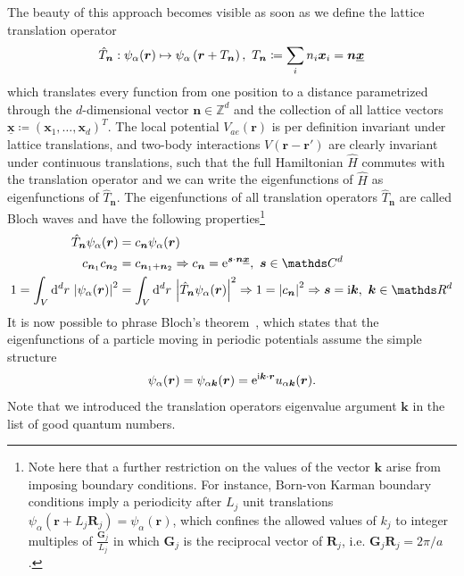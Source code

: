 The beauty of this approach becomes visible as soon as we define the lattice translation operator
\begin{align}
    \hat T_{\bm n} : \psi_\alpha({\bm r}) \mapsto \psi_\alpha\left( {\bm r}+T_{\bm n} \right),\ T_{\bm n}\coloneqq\sum_i n_i {\bm x}_i={\bm n}\underline{\bm x}
\end{align}
which translates every function from one position to a distance parametrized through the $d$-dimensional vector ${\bm n}\in\mathds Z^d$ and the collection of all lattice vectors $\underline{\bm x}\coloneqq ({\bm x}_1,\dots,{\bm x}_d)^T$.
The local potential $V_{ae}({\bm r})$ is per definition invariant under lattice translations, and two-body interactions $V({\bm r}-{\bm r'})$ are clearly invariant under continuous translations, such that the full Hamiltonian $\hat H$ commutes with the translation operator and we can write the eigenfunctions of $\hat H$ as eigenfunctions of $\hat T_{\bm n}$.
The eigenfunctions of all translation operators $\hat T_{\bm n}$ are called Bloch waves and have the following properties\footnote{Note here that a further restriction on the values of the vector ${\bm k}$ arise from imposing boundary conditions. For instance, Born-von Karman boundary conditions imply a periodicity after $L_j$ unit translations $\psi_\alpha({\bm r}+ L_j{\bm R}_j)=\psi_\alpha({\bm r})$, which confines the allowed values of $k_j$ to integer multiples of $\frac{\bm G_j}{L_j}$ in which $\bm G_j$ is the reciprocal vector of ${\bm R}_j$, i.e. ${\bm G}_j {\bm R}_j = 2\pi/a$.}
\begin{align}
    \hat T_{\bm n}\psi_{\alpha}({\bm r}) &= c_{\bm n}\psi_{\alpha}({\bm r})\\
    c_{{\bm n}_1}c_{{\bm n}_2} &= c_{{\bm n}_1+{\bm n}_2} \Rightarrow c_{\bm n} = \re^{{\bm s}\cdot{\bm n}\underline{\bm x}},\ {\bm s}\in\mathds C^d\\
    1=\int_V\rd^dr\,\abs{\psi_{\alpha}({\bm r})}^2 &= \int_V\rd^dr\,\abs{\hat T_{\bm n}\psi_{\alpha}({\bm r})}^2 \Rightarrow 1=\abs{c_{\bm n}}^2 \Rightarrow {\bm s}=\ri{\bm k},\ {\bm k}\in\mathds R^d
\end{align}
It is now possible to phrase Bloch's theorem~\cite{Bloch1929}, which states that the eigenfunctions of a particle moving in periodic potentials assume the simple structure
\begin{align}
    \psi_\alpha({\bm r}) = \psi_{\alpha{\bm k}}({\bm r}) = \mathrm e^{\mathrm i{\bm k}\cdot {\bm r}}u_{\alpha{\bm k}}({\bm r}).
    \label{eq:bloch_theorem}
\end{align}
Note that we introduced the translation operators eigenvalue argument $\bm k$ in the list of good quantum numbers.
